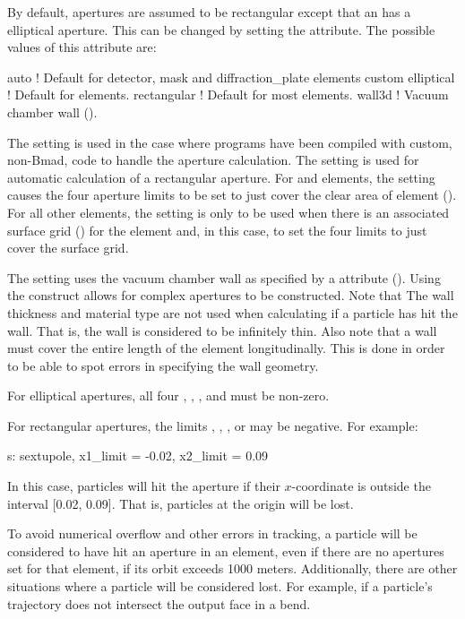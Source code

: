 By default, apertures are assumed to be rectangular except that an  has a elliptical
aperture. This can be changed by setting the  attribute. The possible values of
this attribute are:
\begin{example}
  auto         ! Default for detector, mask and diffraction_plate elements
  custom
  elliptical   ! Default for  elements.
  rectangular  ! Default for most elements.
  wall3d       ! Vacuum chamber wall ().
\end{example}
The  setting is used in the case where programs have been compiled with custom, non-Bmad,
code to handle the aperture calculation.  The  setting is used for automatic calculation of
a rectangular aperture. For  and  elements, the  setting
causes the four aperture limits to be set to just cover the clear area of element
(). For all other elements, the  setting is only to be used when there
is an associated surface grid () for the element and, in this case, \bmad to set
the four limits to just cover the surface grid.

The  setting uses the vacuum chamber wall as specified by a  attribute
(). Using the  construct allows for complex apertures to be
constructed. Note that The wall thickness and material type are not used when calculating
if a particle has hit the wall. That is, the wall is considered to be infinitely thin.
Also note that a wall must cover the entire length of the element longitudinally. This is done
in order to be able to spot errors in specifying the wall geometry.

For elliptical apertures, all four , , , and 
must be non-zero.

For rectangular apertures, the limits , , , or 
may be negative. For example:
\begin{example}
  s: sextupole, x1_limit = -0.02, x2_limit = 0.09
\end{example}
In this case, particles will hit the aperture if their $x$-coordinate is outside the interval [0.02,
0.09]. That is, particles at the origin will be lost.

To avoid numerical overflow and other errors in tracking, a particle will be considered to have hit
an aperture in an element, even if there are no apertures set for that element, if its orbit exceeds
1000 meters. Additionally, there are other situations where a particle will be considered lost. For
example, if a particle's trajectory does not intersect the output face in a bend.

